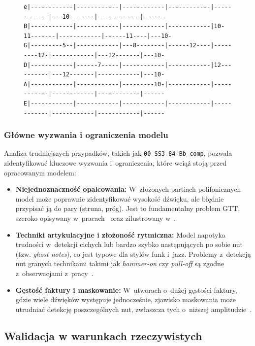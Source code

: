\begin{figure}[H]
{\begin{verbatim}
e|------------|------------|------------|------------|------------|---10-------|------------|------
B|------------|------------|------------|------------|10-11-------|------------|------11----|---10-
G|---------5--|------------|---8--------|------12----|---------12-|------------|---12-------|---10-
D|------------|------7-----|------------|------------|12----------|---12-------|------------|---10-
A|------------|------------|---------10-|------------|------------|------------|------------|------
E|------------|------------|------------|------------|------------|------------|------------|------
\end{verbatim}
    }
\end{figure}


\subsubsection{Główne wyzwania i ograniczenia modelu}
\label{sssec:wyzwania_modelu}

Analiza trudniejszych przypadków, takich jak \texttt{00\_SS3-84-Bb\_comp}, pozwala zidentyfikować kluczowe wyzwania i~ograniczenia, które wciąż stoją przed opracowanym modelem:
\begin{itemize}
    \item \textbf{Niejednoznaczność opalcowania:} W~złożonych partiach polifonicznych model może poprawnie zidentyfikować wysokość dźwięku, ale błędnie przypisać ją do pary (struna, próg). Jest to fundamentalny problem GTT, szeroko opisywany w~pracach~\autocite{ArndtLi2012AutomatedTranscription, Wiggins2019TabCNN} oraz zilustrowany w~\autocite{obrazGitaraNiejednoznacznosc}.
    \item \textbf{Techniki artykulacyjne i złożoność rytmiczna:} Model napotyka trudności w~detekcji cichych lub bardzo szybko następujących po sobie nut (tzw. \textit{ghost notes}), co jest typowe dla stylów funk i~jazz. Problemy z~detekcją nut granych technikami takimi jak \textit{hammer-on} czy \textit{pull-off} są zgodne z~obserwacjami z~pracy~\autocite{Nasution2023HammerOn}.
    \item \textbf{Gęstość faktury i maskowanie:} W~utworach o~dużej gęstości faktury, gdzie wiele dźwięków występuje jednocześnie, zjawisko maskowania może utrudniać detekcję poszczególnych nut, zwłaszcza tych o~niższej amplitudzie~\autocite{Benetos2019AutomaticMusicTranscription}.
\end{itemize}



\subsection{Walidacja w warunkach rzeczywistych}
\label{ssec:walidacja_rzeczywista}

